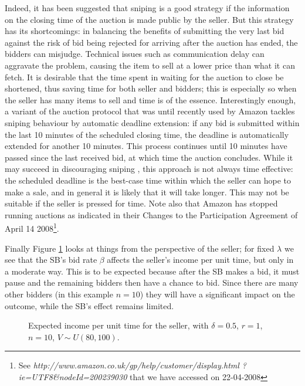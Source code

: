 \documentclass{comjnl}
\begin{document}
Indeed, it has been suggested that sniping is a good strategy
\cite{roth02,ockenfels06,bajari03} if the information on the
closing time of the auction is made public by the seller. But this
strategy has its shortcomings: in balancing the benefits of
submitting the very last bid against the risk of bid being
rejected for arriving after the auction has ended, the bidders can
misjudge. Technical issues such as communication delay can
aggravate the problem, causing the item to sell at a lower price
than what it can fetch. It is desirable that the time spent in
waiting for the auction to close be shortened, thus saving time
for both seller and bidders; this is especially so when the seller
has many items to sell and time is of the essence. Interestingly
enough, a variant of the auction protocol that was until recently
used by Amazon tackles sniping behaviour by automatic deadline
extension: if any bid is submitted within the last 10 minutes of
the scheduled closing time, the deadline is automatically extended
for another 10 minutes. This process continues until 10 minutes
have passed since the last received bid, at which time the auction
concludes. While it may succeed in discouraging sniping
\cite{ockenfels06}, this approach is not always time effective:
the scheduled deadline is the best-case time within which the
seller can hope to make a sale, and in general it is likely that
it will take longer. This may not be suitable if the seller is
pressed for time. Note also that Amazon has stopped running
auctions as indicated in their Changes to the Participation
Agreement of April 14 2008\footnote{See
\emph{http://www.amazon.co.uk/gp/help/customer/display.html
?ie=UTF8\&nodeId=200239030} that we have accessed on 22-04-2008}.


Finally Figure \ref{fig:ExpIncomePerTime} looks at things from the
perspective of the seller; for fixed $\lambda$ we see that the
SB's bid rate $\beta$ affects the seller's income per unit time,
but only in a moderate way. This is to be expected because after
the SB makes a bid, it must pause and the remaining bidders then
have a chance to bid. Since there are many other bidders (in this
example $n=10$) they will have a significant impact on the
outcome, while the SB's effect remains limited.

\begin{figure}
\centering
\caption{Expected income per unit time for the seller, with
$\delta=0.5$, $r=1$, $n=10$, $V\sim
U(80,100)$.}\label{fig:ExpIncomePerTime}
\end{figure}
\end{document}

